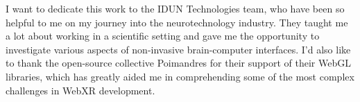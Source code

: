 \begin{dedication}

	I want to dedicate this work to the IDUN Technologies team, who have been so helpful to me on my journey into the neurotechnology industry. They taught me a lot about working in a scientific setting and gave me the opportunity to investigate various aspects of non-invasive brain-computer interfaces. I'd also like to thank the open-source collective Poimandres for their support of their WebGL libraries, which has greatly aided me in comprehending some of the most complex challenges in WebXR development.

\end{dedication}